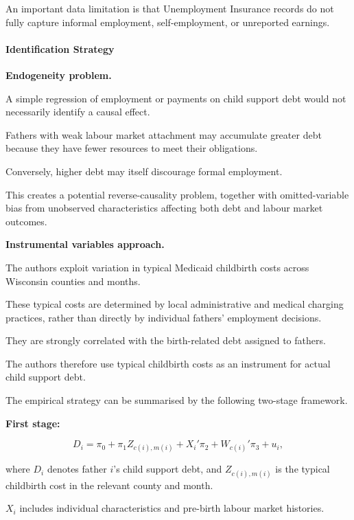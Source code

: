 \documentclass{article}
\begin{document}
An important data limitation is that
Unemployment Insurance records do not
fully capture informal employment,
self-employment, or unreported earnings.

\paragraph{Identification Strategy}

\textbf{Endogeneity problem.}

A simple regression of employment or payments
on child support debt would not necessarily
identify a causal effect.

Fathers with weak labour market attachment
may accumulate greater debt because they
have fewer resources to meet their obligations.

Conversely, higher debt may itself discourage
formal employment.

This creates a potential reverse-causality
problem, together with omitted-variable bias
from unobserved characteristics affecting
both debt and labour market outcomes.

\medskip

\noindent
\textbf{Instrumental variables approach.}

The authors exploit variation in typical
Medicaid childbirth costs across Wisconsin
counties and months.

These typical costs are determined by local
administrative and medical charging practices,
rather than directly by individual fathers'
employment decisions.

They are strongly correlated with the
birth-related debt assigned to fathers.

The authors therefore use typical childbirth
costs as an instrument for actual child
support debt.

The empirical strategy can be summarised
by the following two-stage framework.

\medskip

\noindent
\textbf{First stage:}

\begin{equation}
D_i
=
\pi_0
+
\pi_1 Z_{c(i),m(i)}
+
X_i'\pi_2
+
W_{c(i)}'\pi_3
+
u_i,
\end{equation}

where $D_i$ denotes father $i$'s child
support debt, and $Z_{c(i),m(i)}$ is
the typical childbirth cost in the
relevant county and month.

$X_i$ includes individual characteristics
and pre-birth labour market histories.
\end{document}
